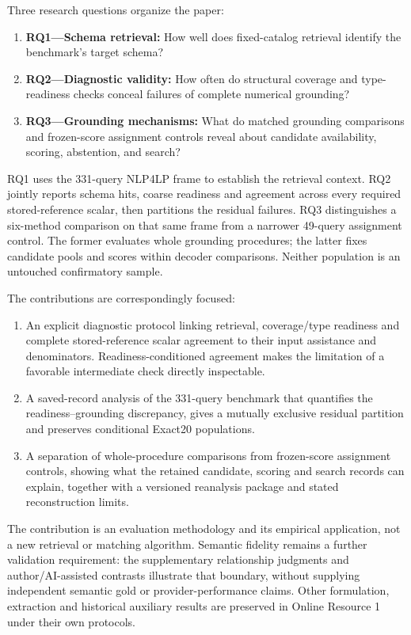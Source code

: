 \documentclass[pdflatex,iicol,sn-basic,Numbered]{sn-jnl}
\begin{document}
Three research questions organize the paper:
\begin{enumerate}
\item \textbf{RQ1---Schema retrieval:} How well does fixed-catalog retrieval identify the benchmark's target schema?
\item \textbf{RQ2---Diagnostic validity:} How often do structural coverage and type-readiness checks conceal failures of complete numerical grounding?
\item \textbf{RQ3---Grounding mechanisms:} What do matched grounding comparisons and frozen-score assignment controls reveal about candidate availability, scoring, abstention, and search?
\end{enumerate}

RQ1 uses the 331-query NLP4LP frame to establish the retrieval context. RQ2 jointly reports schema hits, coarse readiness and agreement across every required stored-reference scalar, then partitions the residual failures. RQ3 distinguishes a six-method comparison on that same frame from a narrower 49-query assignment control. The former evaluates whole grounding procedures; the latter fixes candidate pools and scores within decoder comparisons. Neither population is an untouched confirmatory sample.

The contributions are correspondingly focused:
\label{subsec:intro_contributions}
\begin{enumerate}
\item An explicit diagnostic protocol linking retrieval, coverage/type readiness and complete stored-reference scalar agreement to their input assistance and denominators. Readiness-conditioned agreement makes the limitation of a favorable intermediate check directly inspectable.
\item A saved-record analysis of the 331-query benchmark that quantifies the readiness--grounding discrepancy, gives a mutually exclusive residual partition and preserves conditional Exact20 populations.
\item A separation of whole-procedure comparisons from frozen-score assignment controls, showing what the retained candidate, scoring and search records can explain, together with a versioned reanalysis package and stated reconstruction limits.
\end{enumerate}

The contribution is an evaluation methodology and its empirical application, not a new retrieval or matching algorithm. Semantic fidelity remains a further validation requirement: the supplementary relationship judgments and author/AI-assisted contrasts illustrate that boundary, without supplying independent semantic gold or provider-performance claims. Other formulation, extraction and historical auxiliary results are preserved in Online Resource 1 under their own protocols.
\end{document}
